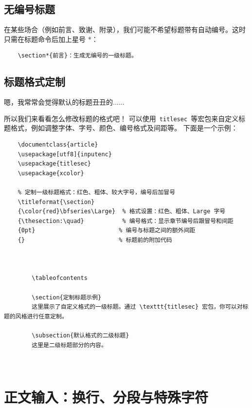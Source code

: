 \subsection{无编号标题}
在某些场合（例如前言、致谢、附录），我们可能不希望标题带有自动编号。这时只需在标题命令后加上星号 *：
\begin{lstlisting}
	\section*{前言}：生成无编号的一级标题。
\end{lstlisting}

\subsection{标题格式定制}
嗯，我常常会觉得默认的标题丑丑的......

所以我们来看看怎么修改标题的格式吧！
可以使用\texttt{ titlesec }等宏包来自定义标题格式，例如调整字体、字号、颜色、编号格式及间距等。
下面是一个示例：
\begin{lstlisting}
	\documentclass{article}
	\usepackage[utf8]{inputenc}
	\usepackage{titlesec}
	\usepackage{xcolor}
	
	% 定制一级标题格式：红色、粗体、较大字号，编号后加冒号
	\titleformat{\section}
	{\color{red}\bfseries\Large}  % 格式设置：红色、粗体、Large 字号
	{\thesection:\quad}           % 编号格式：显示章节编号后跟冒号和间距
	{0pt}                        % 编号与标题之间的额外间距
	{}                           % 标题前的附加代码
	
	
		
		\tableofcontents
		
		\section{定制标题示例}
		这里展示了自定义格式的一级标题。通过 \texttt{titlesec} 宏包，你可以对标题的风格进行任意定制。
		
		\subsection{默认格式的二级标题}
		这里是二级标题部分的内容。
		
	 
\end{lstlisting}
\section{正文输入：换行、分段与特殊字符}

